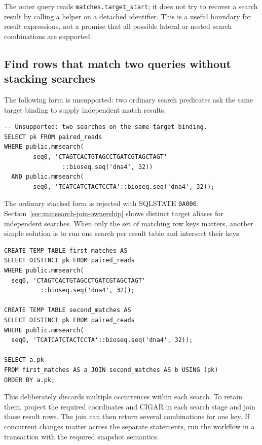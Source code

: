 The outer query reads \texttt{matches.target\_start}; it does not try to
recover a search result by calling a helper on a detached identifier.
This is a useful boundary for result expressions, not a promise that all
possible lateral or nested search combinations are supported.

\subsection{Find rows that match two queries without stacking searches}

The following form is unsupported: two ordinary search predicates ask the
same target binding to supply independent match results.

\par\noindent\begin{minipage}{\linewidth}
\begin{lstlisting}[style=bioseq-appendix-sql]
-- Unsupported: two searches on the same target binding.
SELECT pk FROM paired_reads
WHERE public.mmsearch(
        seq0, 'CTAGTCACTGTAGCCTGATCGTAGCTAGT'
                ::bioseq.seq('dna4', 32))
  AND public.mmsearch(
        seq0, 'TCATCATCTACTCCTA'::bioseq.seq('dna4', 32));
\end{lstlisting}
\end{minipage}

The ordinary stacked form is rejected with SQLSTATE \texttt{0A000}.
Section~\ref{sec:mmsearch-join-ownership} shows distinct target aliases
for independent searches. When only the set of matching row keys matters,
another simple solution is to run one search per result table and intersect
their keys:

\par\noindent\begin{minipage}{\linewidth}
\begin{lstlisting}[style=bioseq-appendix-sql]
CREATE TEMP TABLE first_matches AS
SELECT DISTINCT pk FROM paired_reads
WHERE public.mmsearch(
  seq0, 'CTAGTCACTGTAGCCTGATCGTAGCTAGT'
          ::bioseq.seq('dna4', 32));

CREATE TEMP TABLE second_matches AS
SELECT DISTINCT pk FROM paired_reads
WHERE public.mmsearch(
  seq0, 'TCATCATCTACTCCTA'::bioseq.seq('dna4', 32));

SELECT a.pk
FROM first_matches AS a JOIN second_matches AS b USING (pk)
ORDER BY a.pk;
\end{lstlisting}
\end{minipage}

This deliberately discards multiple occurrences within each search. To
retain them, project the required coordinates and CIGAR in each search
stage and join those result rows. The join can then return several
combinations for one key. If concurrent changes matter across the separate
statements, run the workflow in a transaction with the required snapshot
semantics.

